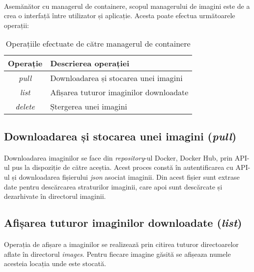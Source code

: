         \paragraph{} Asemănător cu managerul de containere, scopul managerului de imagini este de a crea o interfață între utilizator și aplicație. Acesta poate efectua următoarele operații:
        \begin{table}[h!]
            \centering
            \begin{tabular}{ |c|l| }
                \hline
                \textbf{Operație} & \textbf{Descrierea operației}  \\
                \hline
                \textit{pull}   & Downloadarea și stocarea unei imagini  \\
                \hline
                \textit{list}   & Afișarea tuturor imaginilor downloadate  \\
                \hline
                \textit{delete} & Ștergerea unei imagini  \\
                \hline
            \end{tabular}
            \caption{Operațiile efectuate de către managerul de containere}
            \label{table:cmop}
        \end{table}

        \subsection{Downloadarea și stocarea unei imagini (\textit{pull})}
            \paragraph{} Downloadarea imaginilor se face din \textit{repository}-ul Docker, Docker Hub, prin API-ul pus la dispoziție de către aceștia. Acest proces constă în autentificarea cu API-ul și downloadarea fișierului \textit{json} asociat imaginii. Din acest fișier sunt extrase date pentru descărcarea straturilor imaginii, care apoi sunt descărcate și dezarhivate în directorul imaginii.

        \subsection{Afișarea tuturor imaginilor downloadate (\textit{list})}
            \paragraph{} Operația de afișare a imaginilor se realizează prin citirea tuturor directoarelor aflate în directorul \textit{images}. Pentru fiecare imagine găsită se afișeaza numele acesteia locația unde este stocată.


